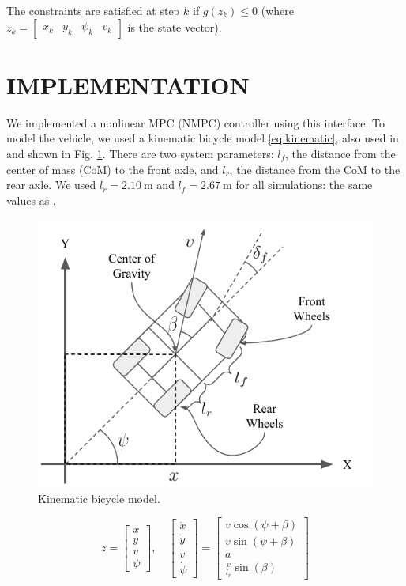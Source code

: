 \documentclass[letterpaper, 10 pt, conference]{ieeeconf}  %
\begin{document}
The constraints are satisfied at step $k$ if $g(z_k) \leq 0$ (where $z_k = \begin{bmatrix}
x_k& y_k& \psi_k& v_k
\end{bmatrix}$ is the state vector).



 \section{IMPLEMENTATION}
 
We implemented a nonlinear MPC (NMPC) controller using this interface. To model the vehicle, we used a kinematic bicycle model \eqref{eq:kinematic}, also used in \cite{farag} and shown in Fig. \ref{fig:kinematic}. There are two system parameters: $l_f$, the distance from the center of mass (CoM) to the front axle, and $l_r$, the distance from the CoM to the rear axle. We used $l_r = 2.10\ \text{m}$ and $l_f = 2.67\ \text{m}$ for all simulations: the same values as \cite{farag}.
 
 \begin{figure}[htbp]
 	\centering
 	\includegraphics[width=0.8\linewidth]{figures/kinematic_diagram.pdf}
 	\caption{Kinematic bicycle model.}
 	\label{fig:kinematic}
 \end{figure}
 

 \begin{equation}
 z = \begin{bmatrix}
 x\\y\\v\\\psi
 \end{bmatrix},\quad \begin{bmatrix}
 \dot x\\\dot y\\\dot v\\\dot\psi
 \end{bmatrix} = \begin{bmatrix}
 v\cos(\psi + \beta)\\
 v\sin(\psi + \beta)\\
 a\\
 \frac{v}{l_r}\sin(\beta)
 \end{bmatrix}
 \label{eq:kinematic}
 \end{equation}
 
\end{document}
